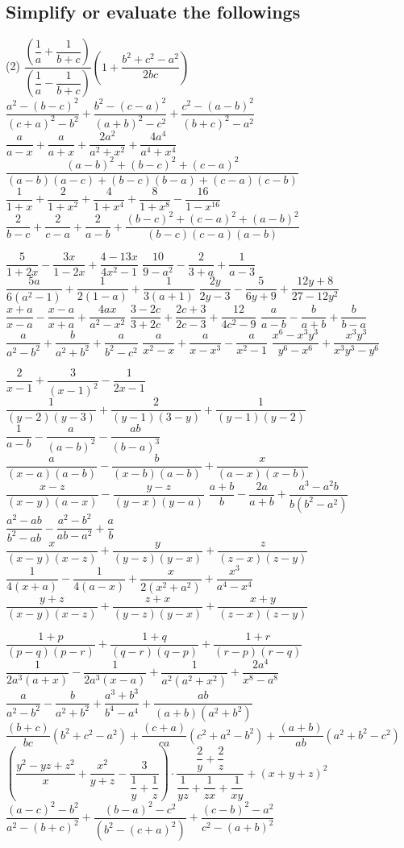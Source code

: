	\subsection*{Simplify or evaluate the followings}
		\begin{tasks}[label = \arabic*.,label-width = 1.5em](2)
			\task $\dfrac{\left(\dfrac{1}{a}+\dfrac{1}{b+c}\right)}{\left(\dfrac{1}{a}-\dfrac{1}{b+c}\right)}\left(1+\dfrac{b^2+c^2-a^2}{2bc}\right)$
			\task $\dfrac{a^2-(b-c)^2}{(c+a)^2-b^2}+\dfrac{b^2-(c-a)^2}{(a+b)^2-c^2}+\dfrac{c^2-(a-b)^2}{(b+c)^2-a^2}$
			\task $\dfrac{a}{a-x}+\dfrac{a}{a+x}+\dfrac{2a^2}{a^2+x^2}+\dfrac{4a^4}{a^4+x^4}$
			\task $\dfrac{(a-b)^2+(b-c)^2+(c-a)^2}{(a-b)(a-c)+(b-c)(b-a)+(c-a)(c-b)}$
			\task $\dfrac{1}{1+x}+\dfrac{2}{1+x^2}+\dfrac{4}{1+x^4}+\dfrac{8}{1+x^8}-\dfrac{16}{1-x^{16}}$
			\task $\dfrac{2}{b-c}+\dfrac{2}{c-a}+\dfrac{2}{a-b}+ \dfrac{(b-c)^2+(c-a)^2+(a-b)^2}{(b-c)(c-a)(a-b)}$
			
			\task $\dfrac{5}{1+2x}-\dfrac{3x}{1-2x}+\dfrac{4-13x}{4x^2-1}$
			\task $\dfrac{10}{9-a^2}-\dfrac{2}{3+a}+\dfrac{1}{a-3}$
			\task $\dfrac{5a}{6(a^2-1)}+\dfrac{1}{2(1-a)}+\dfrac{1}{3(a+1)}$
			\task $\dfrac{2y}{2y-3}-\dfrac{5}{6y+9}+\dfrac{12y+8}{27-12y^2}$
			\task $\dfrac{x+a}{x-a}-\dfrac{x-a}{x+a}+\dfrac{4ax}{a^2-x^2}$
			\task $\dfrac{3-2c}{3+2c}+\dfrac{2c+3}{2c-3}+\dfrac{12}{4c^2-9}$
			\task $\dfrac{a}{a-b}-\dfrac{b}{a+b}+\dfrac{b}{b-a}$
			\task $\dfrac{a}{a^2-b^2}+\dfrac{b}{a^2+b^2}+\dfrac{a}{b^2-c^2}$
			\task $\dfrac{a}{x^2-x}+\dfrac{a}{x-x^3}-\dfrac{a}{x^2-1}$
			\task $\dfrac{x^6-x^3y^3}{y^6-x^6}+\dfrac{x^3y^3}{x^3y^3-y^6}$


			\task $\dfrac{2}{x-1}+\dfrac{3}{(x-1)^2}-\dfrac{1}{2x-1}$
			\task $\dfrac{1}{(y-2)(y-3)}+\dfrac{2}{(y-1)(3-y)}+\dfrac{1}{(y-1)(y-2)}$
			\task $\dfrac{1}{a-b}-\dfrac{a}{(a-b)^2}-\dfrac{ab}{(b-a)^3}$
			\task $\dfrac{a}{(x-a)(a-b)}-\dfrac{b}{(x-b)(a-b)}+\dfrac{x}{(a-x)(x-b)}$
			\task $\dfrac{x-z}{(x-y)(a-x)}-\dfrac{y-z}{(y-x)(y-a)}$
			\task $\dfrac{a+b}{b}-\dfrac{2a}{a+b}+\dfrac{a^3-a^2b}{b(b^2-a^2)}$
			\task $\dfrac{a^2-ab}{b^2-ab}-\dfrac{a^2-b^2}{ab-a^2}+\dfrac{a}{b}$
			\task $\dfrac{x}{(x-y)(x-z)}+\dfrac{y}{(y-z)(y-x)}+\dfrac{z}{(z-x)(z-y)}$
			\task $\dfrac{1}{4(x+a)}-\dfrac{1}{4(a-x)}+\dfrac{x}{2(x^2+a^2)}+\dfrac{x^3}{a^4-x^4}$
			\task $\dfrac{y+z}{(x-y)(x-z)}+\dfrac{z+x}{(y-z)(y-x)}+\dfrac{x+y}{(z-x)(z-y)}$
			
			
			
			
			\task* $\dfrac{1+p}{(p-q)(p-r)}+\dfrac{1+q}{(q-r)(q-p)}+\dfrac{1+r}{(r-p)(r-q)}$
			\task* $\dfrac{1}{2a^3(a+x)}-\dfrac{1}{2a^3(x-a)}+\dfrac{1}{a^2(a^2+x^2)}+\dfrac{2a^4}{x^8-a^8}$
			\task* $\dfrac{a}{a^2-b^2}-\dfrac{b}{a^2+b^2}+\dfrac{a^3+b^3}{b^4-a^4}+\dfrac{ab}{(a+b)(a^2+b^2)}$
			\task* $\dfrac{(b+c)}{bc}(b^2+c^2-a^2)+\dfrac{(c+a)}{ca}(c^2+a^2-b^2)+\dfrac{(a+b)}{ab}(a^2+b^2-c^2)$
			\task* $\left(\dfrac{y^2-yz+z^2}{x}+\dfrac{x^2}{y+z}-\dfrac{3}{\dfrac{1}{y}+\dfrac{1}{z}}\right)\cdot\dfrac{\dfrac{2}{y}+\dfrac{2}{z}}{\dfrac{1}{yz}+\dfrac{1}{zx}+\dfrac{1}{xy}}+(x+y+z)^2$
			\task* $\dfrac{(a-c)^2-b^2}{a^2-(b+c)^2}+\dfrac{(b-a)^2-c^2}{(b^2-(c+a)^2)}+\dfrac{(c-b)^2-a^2}{c^2-(a+b)^2}$
			

\end{tasks}

